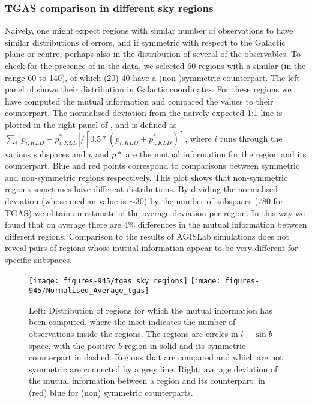 \subsubsection{TGAS comparison in different sky regions}

Naively, one might expect regions with similar number of observations
to have similar distributions of errors, and if symmetric with respect
to the Galactic plane or centre, perhaps also in the distribution of several
of the observables. To check for the presence of   in
the data, we selected 60 regions with a similar  
(in the range 60 to 140), of which (20) 40 have a (non-)symmetric 
counterpart.  The left panel of 
shows their distribution in Galactic coordinates. For these regions we
have computed the mutual information and compared the values to their
counterpart. The normalised deviation from the naively
expected 1:1 line is plotted in the right panel of 
, and is defined as $ \sum_i |p_{i,KLD} -
p_{i,KLD}^*|/[0.5*(p_{i,KLD} + p_{i,KLD}^*)]$, where $i$ runs through
the various subspaces and $p$ and $p*$ are the mutual information for
the region and its counterpart. Blue and red points correspond to comparisons between symmetric and 
non-symmetric regions respectively. This plot shows that non-symmetric
regions sometimes have  different distributions. 
By dividing the normalised deviation (whose median value is $\sim 30$) 
by the number of subspaces (780 for TGAS) we obtain an estimate
of the average deviation per region. In this way we found that on
average there are 4\% differences in the mutual information between
different regions. Comparison to the results of AGISLab simulations
does not reveal pairs of regions whose mutual information appear to be
very different for specific subspaces.
\begin{figure}
\begin{center}
\texttt{[image: figures-945/tgas\_sky\_regions]}
\texttt{[image: figures-945/Normalised\_Average\_tgas]}
\caption{Left: Distribution of regions for which the mutual information has been computed, where the inset indicates the number 
of observations inside the regions. The regions are circles in $l-\sin b$ space, with the positive $b$ region in solid and its symmetric counterpart in dashed. Regions that are compared and which are not symmetric are connected by a grey line. Right: average deviation of the mutual information between a region and its counterpart, in (red) blue  for (non) symmetric counterparts.}\label{fig:tgas_sky}
\end{center}
\end{figure}

